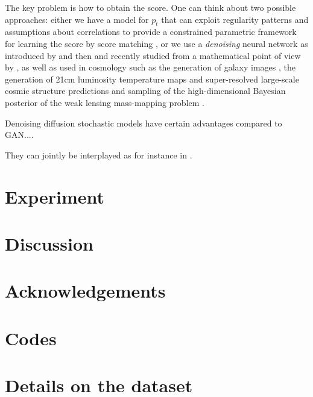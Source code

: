 \documentclass[11pt]{amsart}
\begin{document}
The key problem is how to obtain the score. One can think about two possible approaches: either we have a model for $p_t$ \citep[e.g.][]{Guth2022b,Lempereur2024} that can exploit regularity patterns and assumptions about correlations to provide a constrained parametric framework for learning the score by score matching \citep{hyvarinen2005a}, or we use a \textit{denoising} neural network as introduced by \cite{Bengio2013} and then \cite{Sohl-Dickstein2015,Ho2020} and recently studied from a mathematical point of view by \citep{kadkhodaie2024generalization}, as well as used in cosmology such as the generation of galaxy images \citep{smith2021}, the generation of 21cm luminosity temperature maps \citep{Zhao2023} and super-resolved large-scale cosmic structure predictions \citep{Schanz2023} and sampling of the high-dimensional Bayesian posterior of the weak lensing mass-mapping problem \citep{Remy2023}.

Denoising diffusion stochastic models have certain advantages compared to GAN.... 


They can jointly be interplayed as for instance in \citep{zhang2021diffusion,gong2021interpreting}.  


%
\section{Experiment}



\section{Discussion}


\section*{Acknowledgements}

\section*{Codes}


\appendix
\section{Details on the dataset}
\end{document}
